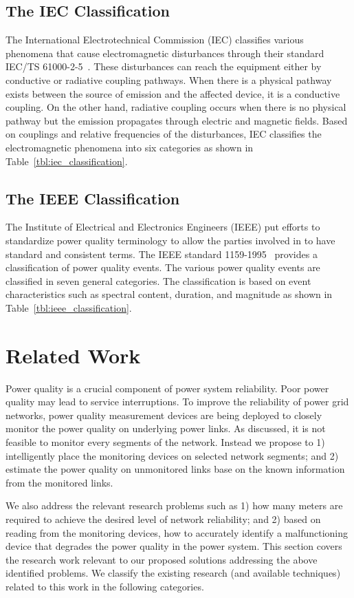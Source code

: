 \subsection{The IEC Classification}
The International Electrotechnical Commission (IEC) classifies various phenomena that cause electromagnetic disturbances through their standard IEC/TS 61000-2-5~\cite{iec_61000}. These disturbances can reach the equipment either by conductive or radiative coupling pathways. When there is a physical pathway exists between the source of emission and the affected device, it is a conductive coupling. On the other hand, radiative coupling occurs when there is no physical pathway but the emission propagates through electric and magnetic fields. Based on couplings and relative frequencies of the disturbances, IEC classifies the electromagnetic phenomena into six categories as shown in Table~\ref{tbl:iec_classification}.

\subsection{The IEEE Classification}
The Institute of Electrical and Electronics Engineers (IEEE) put efforts to standardize power quality terminology to allow the parties involved in to have standard and consistent terms. The IEEE standard 1159-1995~\cite{IEEE09_1159} provides a classification of power quality events. The various power quality events are classified in seven general categories. The classification is based on event characteristics such as spectral content, duration, and magnitude as shown in Table~\ref{tbl:ieee_classification}.

\section{Related Work}
\label{sec:related_work}
Power quality is a crucial component of power system reliability. Poor power quality may lead to service interruptions. To improve the reliability of power grid networks, power quality measurement devices are being deployed to closely monitor the  power quality on underlying power links. As discussed, it is not feasible to monitor every segments of the network. Instead we propose to 1) intelligently place the monitoring devices on selected network segments; and 2) estimate the power quality on unmonitored links base on the known information from the monitored links.

We also address the relevant research problems such as 1) how many meters are required to achieve the desired level of network reliability; and 2) based on reading from the monitoring devices, how to accurately identify a malfunctioning device that degrades the power quality in the power system. This section covers the research work relevant to our proposed solutions addressing the above identified problems. We classify the existing research (and available techniques) related to this work in the following categories.

